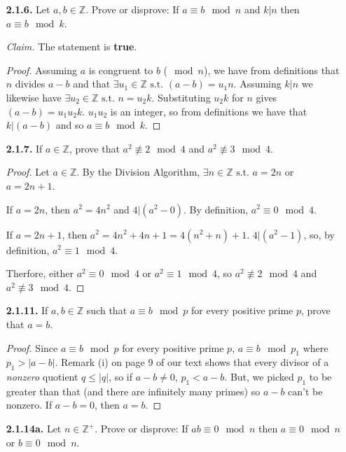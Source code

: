 \documentclass[12pt]{article}
\newcommand{\zee}{\mathbb{Z}}
\newcommand{\such}{\text{ s.t. }}
\newcommand{\abs}[1]{{\lvert}#1{\rvert}}
\begin{document}
\begin{itemize}
\item[\textbf{2.1.6.}] Let $a,b\in\zee$. Prove or disprove: If $a\equiv b \mod n$ and $k|n$ then $a\equiv b \mod k$.

\textit{Claim.} The statement is \textbf{true}.

\begin{proof}
  Assuming $a$ is congruent to $b$ ($\mod n$), we have from definitions that $n$ divides $a-b$ and that $\exists u_1 \in \zee \such (a-b) = u_1 n$.
  Assuming $k|n$ we likewise have $\exists u_2 \in \zee \such n = u_2 k$.
  Substituting $u_2 k$ for $n$ gives $(a-b) = u_1 u_2 k$.
  $u_1 u_2$ is an integer, so from definitions we have that $k|(a-b)$ and so $a\equiv b \mod k$.
\end{proof}


\item[\textbf{2.1.7.}] If $a\in\zee$, prove that $a^2\not\equiv2\mod4$ and $a^2\not\equiv3\mod4$.

\begin{proof}
  Let $a\in\zee$.
  By the Division Algorithm, $\exists n \in \zee \such a=2n$ or $a=2n+1$.
  \par
  If $a = 2n$, then $a^2 = 4n^2$ and $4|(a^2 - 0)$.
  By definition, $a^2\equiv0\mod4$.
  \par
  If $a=2n+1$, then $a^2 = 4n^2 + 4n + 1 = 4(n^2 + n) + 1$.
  $4|(a^2 - 1)$, so, by definition, $a^2\equiv1\mod4$.
  \par
  Therfore, either $a^2\equiv0\mod4$ or $a^2\equiv1\mod4$, so $a^2\not\equiv2\mod4$ and $a^2\not\equiv3\mod4$.
\end{proof}


\item[\textbf{2.1.11.}]  If $a,b\in\zee$ such that $a\equiv b\mod p$ for every positive prime $p$, prove that $a=b$.

\begin{proof}
Since $a\equiv b\mod p$ for every positive prime $p$, $a\equiv b\mod p_1$ where $p_1 > \abs{a-b}$.
Remark (i) on page 9 of our text shows that every divisor of a \textit{nonzero} quotient $q \leq \abs{q}$, so if $a-b\neq 0$, $p_1 < a-b$.
But, we picked $p_1$ to be greater than that (and there are infinitely many primes) so $a-b$ can't be nonzero.
If $a-b = 0$, then $a=b$.
\end{proof}


\item[\textbf{2.1.14a.}] Let $n\in\zee^+$. Prove or disprove:  If $ab\equiv0\mod n$ then $a\equiv0\mod n$ or $b\equiv0\mod n$.


\end{itemize}
\end{document}
